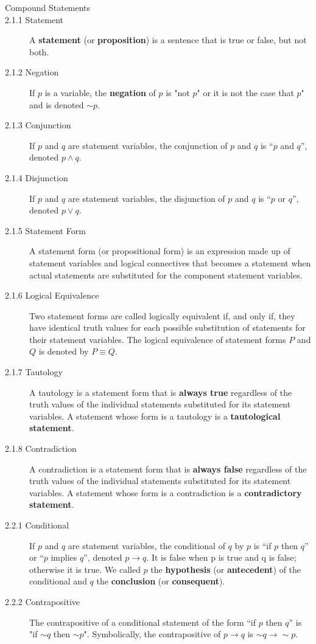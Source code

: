 \documentclass{article}
\begin{document}
\begin{description}
    \vspace{0.2cm}
    \item[\large Compound Statements]
    \item[2.1.1 Statement]A \textbf{statement} (or \textbf{proposition}) is a sentence that is true or false, but not both.
    \item[2.1.2 Negation]If $p$ is a variable, the \textbf{negation} of $p$ is "not $p$" or it is not the case that $p$" and is denoted ${\sim}p$. 
    \item[2.1.3 Conjunction]If $p$ and $q$ are statement variables, the conjunction of $p$ and $q$ is “$p$ and $q$”, denoted $p \wedge q$.
    \item[2.1.4 Disjunction]If $p$ and $q$ are statement variables, the disjunction of $p$ and $q$ is “$p$ or $q$”, denoted $p \vee q$.
    \item[2.1.5 Statement Form]A statement form (or propositional form) is an expression made up of statement variables and logical connectives that becomes a statement when actual statements are substituted for the component statement variables.
    \item[2.1.6 Logical Equivalence]Two statement forms are called logically equivalent if, and only if, they have identical truth values for each possible substitution of statements for their statement variables. The logical equivalence of statement forms $P$ and $Q$ is denoted by $P \equiv Q$.
    \item[2.1.7 Tautology]A tautology is a statement form that is \textbf{always true} regardless of the truth values of the individual statements substituted for its statement variables. A statement whose form is a tautology is a \textbf{tautological statement}.
    \item[2.1.8 Contradiction]A contradiction is a statement form that is \textbf{always false} regardless of the truth values of the individual statements substituted for its statement variables. A statement whose form is a contradiction is a \textbf{contradictory statement}. 
    \item[2.2.1 Conditional]If $p$ and $q$ are statement variables, the conditional of $q$ by $p$ is “if $p$ then $q$” or “$p$ implies $q$”, denoted $p\to q$. It is false when p is true and q is false; otherwise it is true. We called $p$ the \textbf{hypothesis} (or \textbf{antecedent}) of the conditional and $q$ the \textbf{conclusion} (or \textbf{consequent}).
    \item[2.2.2 Contrapositive] The contrapositive of a conditional statement of the form “if $p$ then $q$” is "if ${\sim} q$ then ${\sim} p$". Symbolically, the contrapositive of $p\to q$ is ${\sim} q\to {\sim} p$.

\end{description}
\end{document}
